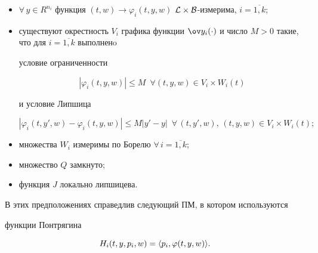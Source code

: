 \begin{itemize}


\item[\bf (H1)] $\forall \, y\in R^{n_i}$ функция $(t,w)\rightarrow


\varphi_i(t,y,w)$ ${\cal L\times B}$-измерима, $i=\overline{1,k}$;


\item[\bf (H2)]


существуют окрестность $V_i$ графика функции $\ov


y_i(\cdot)$ и число $M>0$ такие, что для $i=\overline{1,k}$ выполненo


условие ограниченности


$$


|\varphi_i(t,y,w)|\leq M \ \; \forall (t,y,w)\in V_i\times W_i(t)


$$


и условие Липшица


$$


|\varphi_i(t,y',w)-\varphi_i(t,y,w)|\leq M|y'-y|\ \;


\forall \, (t,y',w),\, (t,y,w)\in V_i\times W_i(t);


$$


\item[\bf (H3)] множества $W_i$ измеримы по Борелю $\forall\,


i=\overline{1,k}$;


\item[\bf (H4)] множество $Q$ замкнуто;


\item[\bf (H5)] функция $J$ локально липшицева.


\end{itemize}





В этих предположениях справедлив следующий ПМ, в котором используются


функции Понтрягина


$$


H_i(t,y,p_i,w)=\la p_i,\varphi(t,y,w)\ra.


$$





